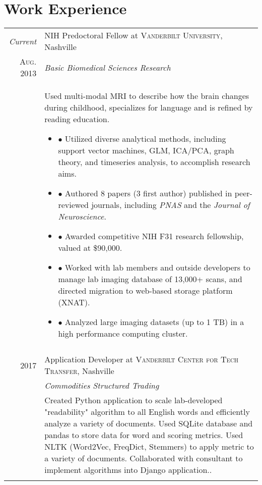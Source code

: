 \documentclass[a4paper,10pt]{article}
\begin{document}
\section{Work Experience}
\begin{tabular}{r|p{11cm}}
 
 	\emph{Current} & NIH Predoctoral Fellow at \textsc{Vanderbilt University}, Nashville \\
 	\textsc{Aug. 2013}&\emph{Basic Biomedical Sciences Research}\\
 	&\footnotesize{Used multi-modal MRI to describe how the brain changes during childhood, specializes for language and is refined by reading education.}
 	\begin{itemize}
    \item{$\bullet$}
         {Utilized diverse analytical methods, including support vector machines, GLM, ICA/PCA, graph theory, and timeseries analysis, to accomplish research aims.}
    \item{$\bullet$}
         {Authored 8 papers (3 first author) published in peer-reviewed journals,  including  \textit{PNAS} and the  \textit{Journal of Neuroscience}.}     
    \item{$\bullet$}
         {Awarded competitive NIH F31 research fellowship, valued at \$90,000.}
    \item{$\bullet$}
         {Worked with lab members and outside developers to manage lab imaging database of 13,000+ scans, and directed migration to web-based storage platform (XNAT).}         
    \item{$\bullet$}
         {Analyzed large imaging datasets (up to 1 TB) in a high performance computing cluster.}
	\end{itemize}
 	\\\multicolumn{2}{c}{} \\
    
 	\textsc{2017} & Application Developer at \textsc{Vanderbilt Center for Tech Transfer}, Nashville \\
 	&\emph{Commodities Structured Trading}\\&\footnotesize{Created Python application to scale lab-developed "readability" algorithm to all English words and efficiently analyze a variety of documents. Used SQLite database and pandas to store data for word and scoring metrics. Used NLTK (Word2Vec, FreqDict, Stemmers) to apply metric to a variety of documents. Collaborated with consultant to implement algorithms into Django application..}\\\multicolumn{2}{c}{} \\


\end{tabular}
\end{document}
